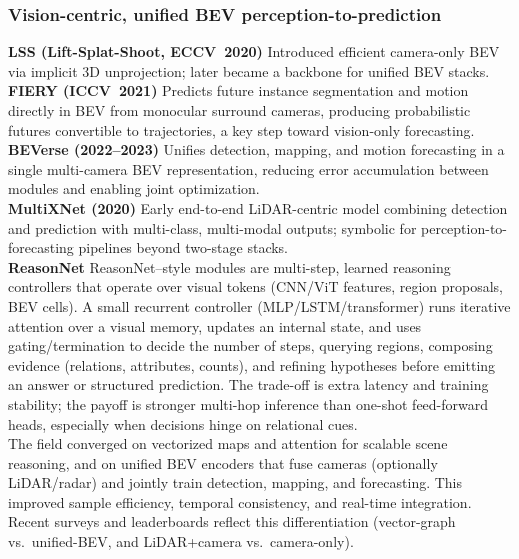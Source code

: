 \documentclass[12pt,a4paper]{report}
\begin{document}
\subsubsection{Vision-centric, unified BEV perception-to-prediction}
\quad \textbf{LSS (Lift-Splat-Shoot, ECCV~2020)} Introduced efficient camera-only BEV via implicit 3D unprojection; later became a backbone for unified BEV stacks. \cite{Philion2020LSS}\\

\textbf{FIERY (ICCV~2021)} Predicts future instance segmentation and motion directly in BEV from monocular surround cameras, producing probabilistic futures convertible to trajectories, a key step toward vision-only forecasting. \cite{Hu2021FIERY} \\

\textbf{BEVerse (2022--2023)} Unifies detection, mapping, and motion forecasting in a single multi-camera BEV representation, reducing error accumulation between modules and enabling joint optimization.  \cite{BEVerse2022}\\

\textbf{MultiXNet (2020)} Early end-to-end LiDAR-centric model combining detection and prediction with multi-class, multi-modal outputs; symbolic for perception-to-forecasting pipelines beyond two-stage stacks. \cite{MultiXNet2020}\\

\textbf{ReasonNet} ReasonNet–style modules are multi-step, learned reasoning controllers that operate over visual tokens (CNN/ViT features, region proposals, BEV cells). A small recurrent controller (MLP/LSTM/transformer) runs iterative attention over a visual memory, updates an internal state, and uses gating/termination to decide the number of steps, querying regions, composing evidence (relations, attributes, counts), and refining hypotheses before emitting an answer or structured prediction. The trade-off is extra latency and training stability; the payoff is stronger multi-hop inference than one-shot feed-forward heads, especially when decisions hinge on relational cues. \cite{Shao2023ReasonNet}\\

The field converged on vectorized maps and attention for scalable scene reasoning, and on unified BEV encoders that fuse cameras (optionally LiDAR/radar) and jointly train detection, mapping, and forecasting. This improved sample efficiency, temporal consistency, and real-time integration. Recent surveys and leaderboards reflect this differentiation (vector-graph vs.\ unified-BEV, and LiDAR+camera vs.\ camera-only). \\
\end{document}

